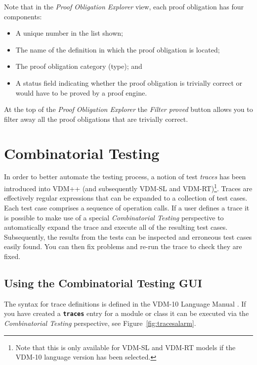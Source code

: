 \documentclass{overturerepchap}
\begin{document}
Note that in the \emph{Proof Obligation Explorer} view, each proof
obligation has four components:
\begin{itemize}
\item A unique number in the list shown;
\item The name of the definition in which the proof obligation is
  located;
\item The proof obligation category (type); and
\item A status field indicating whether the proof obligation is
  trivially correct or would have to be proved by a proof engine.
\end{itemize}

At the top of the \emph{Proof Obligation Explorer} the \emph{Filter proved} button
allows you to filter away all the proof obligations that are trivially
correct.

\chapter{Combinatorial Testing}\label{sec:testing}

In order to better automate the testing process, a notion of
test \emph{traces} has been introduced into VDM++ (and subsequently VDM-SL and VDM-RT)\footnote{Note that this is
only available for VDM-SL and VDM-RT models if the VDM-10 language version has been selected.}.
Traces are effectively regular expressions that can be expanded to a collection of test
cases. Each test case comprises a sequence of operation
calls. If a user defines a trace it is possible to make use of a
special \emph{Combinatorial Testing} perspective to automatically
expand the trace and execute all of the resulting test
cases. Subsequently, the results from the tests can be inspected
and erroneous test cases easily found. You can then fix
problems and re-run the trace to check they are fixed.

\section{Using the Combinatorial Testing GUI}

The syntax for trace definitions is defined in the VDM-10 Language
Manual \cite{Larsen&10b}.
If you have created a {\textbf\texttt{traces}} entry for a module or class it
can be executed via the \emph{Combinatorial Testing}
perspective, see
Figure~\ref{fig:tracesalarm}.
\end{document}
